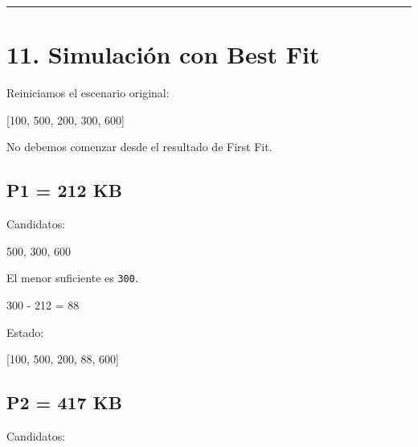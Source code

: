 \documentclass[
  spanish,
  letterpaper,
]{scrbook}
\newenvironment{Shaded}{\begin{snugshade}}{\end{snugshade}}
\newcommand{\NormalTok}[1]{\textcolor[rgb]{0.00,0.23,0.31}{#1}}
\begin{document}
\begin{center}\rule{0.5\linewidth}{0.5pt}\end{center}


\chapter{11. Simulación con Best Fit}\label{simulaciuxf3n-con-best-fit}

Reiniciamos el escenario original:

\begin{Shaded}
\begin{Highlighting}[]
\NormalTok{[100, 500, 200, 300, 600]}
\end{Highlighting}
\end{Shaded}

No debemos comenzar desde el resultado de First Fit.

\section{P1 = 212 KB}\label{p1-212-kb-1}

Candidatos:

\begin{Shaded}
\begin{Highlighting}[]
\NormalTok{500, 300, 600}
\end{Highlighting}
\end{Shaded}

El menor suficiente es \texttt{300}.

\begin{Shaded}
\begin{Highlighting}[]
\NormalTok{300 {-} 212 = 88}
\end{Highlighting}
\end{Shaded}

Estado:

\begin{Shaded}
\begin{Highlighting}[]
\NormalTok{[100, 500, 200, 88, 600]}
\end{Highlighting}
\end{Shaded}

\section{P2 = 417 KB}\label{p2-417-kb-1}

Candidatos:
\end{document}
